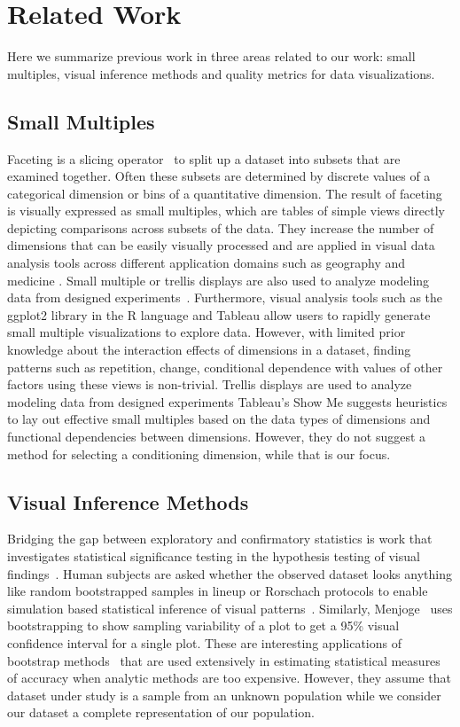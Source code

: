 \section{Related Work}
\label{sec:related}
Here we summarize previous work in three areas related to our work: small multiples, visual inference methods and quality metrics for data visualizations.

\subsection{Small Multiples}
Faceting is a slicing operator~\cite{Wilkinson2005GG, Munzner2014} to split up a dataset into subsets that are examined together. Often these subsets are determined by discrete values of a categorical dimension or bins of a quantitative dimension. The result of faceting is visually expressed as small multiples, which are tables of simple views directly depicting comparisons across subsets of the data. They increase the number of dimensions that can be easily visually processed and are applied in visual data analysis tools across different application domains such as geography \cite{Guo2006, Maceachren2003} and medicine \cite{Lunzer2010, Sarni2005}. Small multiple or trellis displays are also used to analyze modeling data from designed experiments~\cite{Fuentes2011}.
Furthermore, visual analysis tools such as the ggplot2 library in the R language \cite{Wickham2006} and Tableau \cite{Stolte2002} allow users to rapidly generate small multiple visualizations to explore data. However, with limited prior knowledge about the interaction effects of dimensions in a dataset, finding patterns such as repetition, change, conditional dependence with values of other factors using these views is non-trivial. Trellis displays are used to analyze modeling data from designed experiments
Tableau's Show Me \cite{mackinlay2007} suggests heuristics to lay out effective small multiples based on the data types of dimensions and functional dependencies between dimensions. However, they do not suggest a method for selecting a conditioning dimension, while that is our focus. 

\subsection{Visual Inference Methods}
Bridging the gap between exploratory and confirmatory statistics is work that investigates statistical significance testing in the hypothesis testing of visual findings~\cite{Wickham2013, Majumder2013}. Human subjects are asked whether the observed dataset looks anything like random bootstrapped samples in lineup or Rorschach protocols to enable simulation based statistical inference of visual patterns~\cite{Buja2009}. Similarly, Menjoge~\cite{Menjoge2010} uses bootstrapping to show sampling variability of a plot to get a 95\% visual confidence interval for a single plot. These are interesting applications of bootstrap methods~\cite{Efron1979} that are used extensively in estimating statistical measures of accuracy when analytic methods are too expensive. However, they assume that dataset under study is a sample from an unknown population while we consider our dataset a complete representation of our population.

